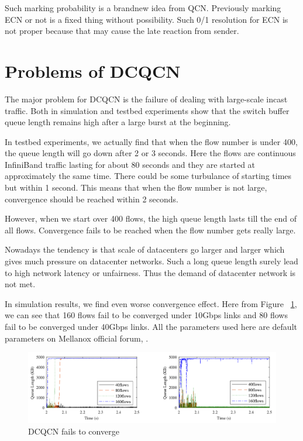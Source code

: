 \documentclass[12pt,a4paper]{article}
\begin{document}
Such marking probability is a brandnew idea from QCN.
Previously marking ECN or not is a fixed thing without possibility.
Such 0/1 resolution for ECN is not proper because that may cause the late reaction from sender.

\section{Problems of DCQCN}
The major problem for DCQCN is the failure of dealing with large-scale incast traffic.
Both in simulation and testbed experiments show that the switch buffer queue length remains high after a large burst at the beginning.

In testbed experiments, we actually find that when the flow number is under 400, the queue length will go down after 2 or 3 seconds.
Here the flows are continuous InfiniBand traffic lasting for about 80 seconds and they are started at approximately the same time.
There could be some turbulance of starting times but within 1 second.
This means that when the flow number is not large, convergence should be reached within 2 seconds.

However, when we start over 400 flows, the high queue length lasts till the end of all flows.
Convergence fails to be reached when the flow number gets really large.

Nowadays the tendency is that scale of datacenters go larger and larger which gives much pressure on datacenter networks.
Such a long queue length surely lead to high network latency or unfairness.
Thus the demand of datacenter network is not met.

In simulation results, we find even worse convergence effect.
Here from Figure ~\ref{fig:DCQCNfail}, we can see that 160 flows fail to be converged under 10Gbps links and 80 flows fail to 
be converged under 40Gbps links.
All the parameters used here are default parameters on Mellanox official forum, \cite{MellanoxOfficial}.

\begin{figure}[ht]
	\begin{center}
		\includegraphics[width=6in]{DCQCNfail}
		\caption{DCQCN fails to converge}
		\label{fig:DCQCNfail}
	\end{center}
\end{figure}
\end{document}
